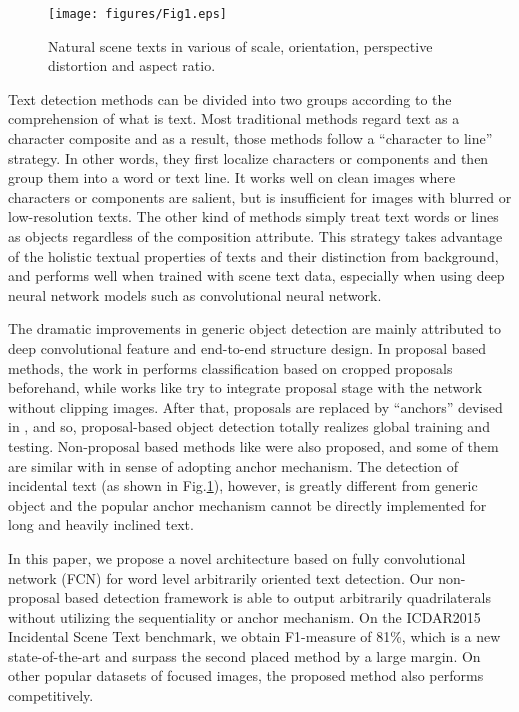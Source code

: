 \documentclass[10pt,twocolumn,letterpaper]{article}
\begin{document}
	\begin{figure}
		\label{Fig.1}
		\centering
		\texttt{[image: figures/Fig1.eps]}
		\caption{Natural scene texts in various of scale, orientation, perspective distortion and aspect ratio.}
	\end{figure}
	
	Text detection methods can be divided into two groups according to the comprehension of what is text. Most traditional methods \cite{swt} \cite{yfpan} \cite{mser1} \cite{mser2} \cite{textflow} regard text as a character composite \cite{survey} and as a result, those methods follow a ``character to line'' strategy. 
	In other words, they first localize characters or components and then group them into a word or text line. 
	It works well on clean images where characters or components are salient, but is insufficient for images with blurred or low-resolution texts.
	The other kind of methods simply treat text words or lines as objects \cite{yolo-text} \cite{symmetry-text} \cite{deep-text} regardless of the composition attribute. 
	This strategy takes advantage of the holistic textual properties of texts and their distinction from background, and performs well when trained with scene text data, especially when using deep neural network models such as convolutional neural network.
	
	The dramatic improvements in generic object detection are mainly attributed to deep convolutional feature and end-to-end structure design. 
	In proposal based methods, the work in \cite{rcnn} performs classification based on cropped proposals beforehand, while works like \cite{sppnet} \cite{fast-rcnn} try to integrate proposal stage with the network without clipping images. 
	After that, proposals are replaced by ``anchors'' devised in \cite{faster-rcnn}, and so, proposal-based object detection totally realizes global training and testing. 
	Non-proposal based methods like \cite{overfeat} \cite{multibox} \cite{yolo} \cite{ssd} \cite{densebox} were also proposed, and some of them are similar with \cite{faster-rcnn} in sense of adopting anchor mechanism. 
	The detection of incidental text (as shown in Fig.\hyperref[Fig.1]{1}), however, is greatly different from generic object and the popular anchor mechanism cannot be directly implemented for long and heavily inclined text.
	
	In this paper, we propose a novel architecture based on fully convolutional network (FCN) \cite{fcn} for word level arbitrarily oriented text detection. 
	Our non-proposal based detection framework is able to output arbitrarily quadrilaterals without utilizing the sequentiality or anchor mechanism. On the ICDAR2015 Incidental Scene Text benchmark, we obtain F1-measure of 81\%, which is a new state-of-the-art and surpass the second placed method by a large margin. On other popular datasets of focused images, the proposed method also performs competitively.
	
\end{document}
